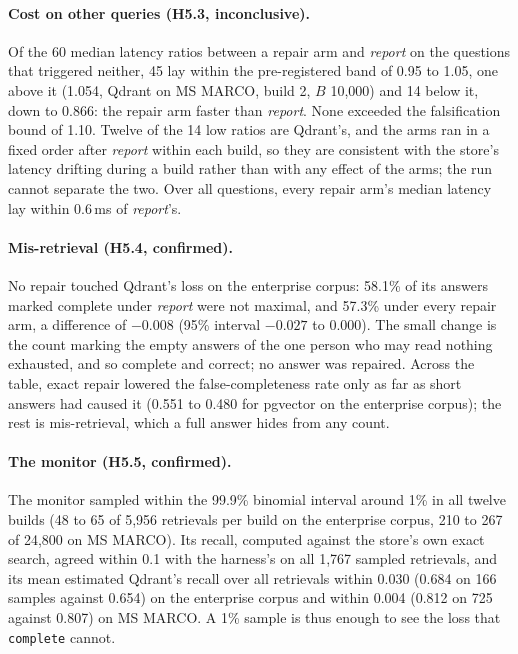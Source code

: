 \paragraph{Cost on other queries (H5.3, inconclusive).}
Of the 60 median latency ratios between a repair arm and \emph{report} on the questions that
triggered neither, 45 lay within the pre-registered band of 0.95 to 1.05, one above it (1.054, Qdrant
on MS MARCO, build 2, $B$ 10,000) and 14 below it, down to 0.866: the repair arm faster than
\emph{report}. None exceeded the falsification bound of 1.10. Twelve of the 14 low ratios are
Qdrant's, and the arms ran in a fixed order after \emph{report} within each build, so they are
consistent with the store's latency drifting during a build rather than with any effect of the arms;
the run cannot separate the two. Over all questions, every repair arm's median latency lay within
0.6\,ms of \emph{report}'s.

\paragraph{Mis-retrieval (H5.4, confirmed).}
No repair touched Qdrant's loss on the enterprise corpus: 58.1\% of its answers marked complete under
\emph{report} were not maximal, and 57.3\% under every repair arm, a difference of $-0.008$ (95\%
interval $-0.027$ to 0.000). The small change is the count marking the empty answers of the one person who may read nothing
exhausted, and so complete and correct; no answer was repaired. Across
the table, exact repair lowered the false-completeness rate only as far as short answers had caused it
(0.551 to 0.480 for pgvector on the enterprise corpus); the rest is mis-retrieval, which a full answer
hides from any count.

\paragraph{The monitor (H5.5, confirmed).}
The monitor sampled within the 99.9\% binomial interval around 1\% in all twelve builds (48 to 65 of
5,956 retrievals per build on the enterprise corpus, 210 to 267 of 24,800 on MS MARCO). Its recall,
computed against the store's own exact search, agreed within 0.1 with the harness's on all 1,767
sampled retrievals, and its mean estimated Qdrant's recall over all retrievals within 0.030 (0.684
on 166 samples against 0.654) on the enterprise corpus and within 0.004 (0.812 on 725 against 0.807)
on MS MARCO. A 1\% sample is thus enough to see the loss that \texttt{complete} cannot.

